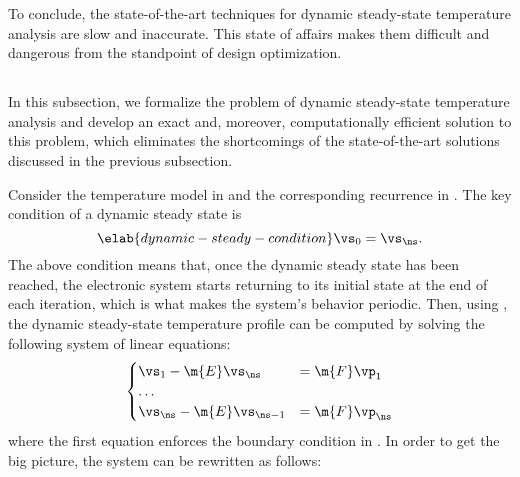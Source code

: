 To conclude, the state-of-the-art techniques for dynamic steady-state
temperature analysis are slow and inaccurate. This state of affairs makes them
difficult and dangerous from the standpoint of design optimization.

\subsection{\solutiontitle}

In this subsection, we formalize the problem of dynamic steady-state temperature
analysis and develop an exact and, moreover, computationally efficient solution
to this problem, which eliminates the shortcomings of the state-of-the-art
solutions discussed in the previous subsection.

Consider the temperature model in  and the corresponding
recurrence in . The key condition of a dynamic steady
state is
\begin{equation} \elab{dynamic-steady-condition}
  \vs_0 = \vs_\ns.
\end{equation}
The above condition means that, once the dynamic steady state has been reached,
the electronic system starts returning to its initial state at the end of each
iteration, which is what makes the system's behavior periodic. Then, using
, the dynamic steady-state temperature profile can be
computed by solving the following system of linear equations:
\[
  \begin{cases}
    \vs_1 - \m{E} \vs_\ns & = \m{F} \vp_1 \\
    \dots \\
    \vs_\ns - \m{E} \vs_{\ns - 1} & = \m{F} \vp_\ns
  \end{cases}
\]
where the first equation enforces the boundary condition in
. In order to get the big picture, the system can
be rewritten as follows:
